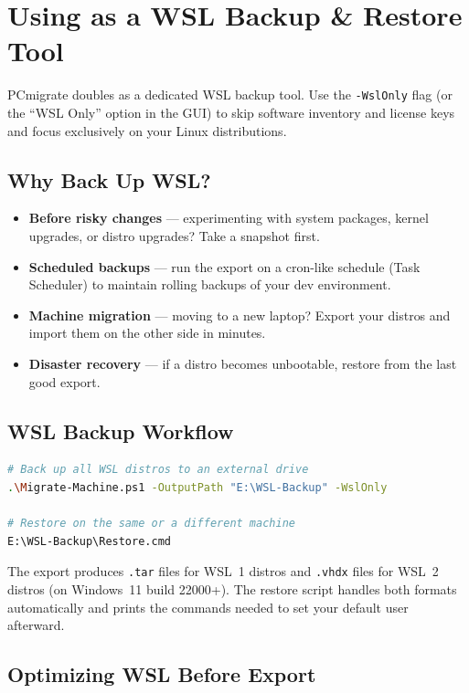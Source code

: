 \documentclass[11pt,a4paper]{article}
\begin{document}
\section{Using as a WSL Backup \& Restore Tool}

PCmigrate doubles as a dedicated WSL backup tool. Use the \texttt{-WslOnly} flag (or the ``WSL Only'' option in the GUI) to skip software inventory and license keys and focus exclusively on your Linux distributions.

\subsection{Why Back Up WSL?}

\begin{itemize}
    \item \textbf{Before risky changes} --- experimenting with system packages, kernel upgrades, or distro upgrades? Take a snapshot first.
    \item \textbf{Scheduled backups} --- run the export on a cron-like schedule (Task Scheduler) to maintain rolling backups of your dev environment.
    \item \textbf{Machine migration} --- moving to a new laptop? Export your distros and import them on the other side in minutes.
    \item \textbf{Disaster recovery} --- if a distro becomes unbootable, restore from the last good export.
\end{itemize}

\subsection{WSL Backup Workflow}

\begin{lstlisting}[language=bash]
# Back up all WSL distros to an external drive
.\Migrate-Machine.ps1 -OutputPath "E:\WSL-Backup" -WslOnly

# Restore on the same or a different machine
E:\WSL-Backup\Restore.cmd
\end{lstlisting}

The export produces \texttt{.tar} files for WSL~1 distros and \texttt{.vhdx} files for WSL~2 distros (on Windows~11 build 22000+). The restore script handles both formats automatically and prints the commands needed to set your default user afterward.

\subsection{Optimizing WSL Before Export}
\end{document}
